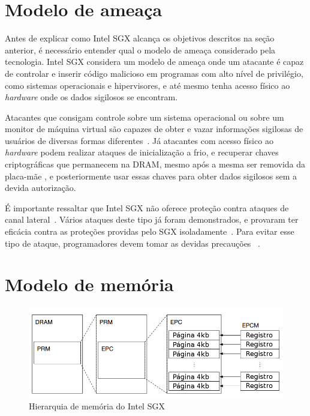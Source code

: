 \section{Modelo de ameaça}
\label{sec:sgx_modelo_ameaca}

Antes de explicar como Intel SGX alcança os objetivos descritos na seção
anterior, é necessário entender qual o modelo de ameaça considerado pela
tecnologia.
Intel SGX considera um modelo de ameaça onde um atacante é capaz de controlar e
inserir código malicioso em programas com alto nível de privilégio, como
sistemas operacionais e hipervisores, e até mesmo tenha acesso físico ao
\textit{hardware} onde os dados sigilosos se encontram.

Atacantes que consigam controle sobre um sistema operacional ou sobre um monitor
de máquina virtual são capazes de obter e vazar informações sigilosas de
usuários de diversas formas diferentes~\cite{trustshadow2017}.
Já atacantes com acesso físico ao \textit{hardware} podem realizar ataques de
inicialização a frio, e recuperar chaves criptográficas que permanecem na DRAM,
mesmo após a mesma ser removida da placa-mãe \cite{coldbootattack}, e
posteriormente usar essas chaves para obter dados sigilosos sem a devida
autorização.

É importante ressaltar que Intel SGX não oferece proteção contra ataques de
canal lateral~\cite{sgxdeveloperreference}. Vários ataques deste tipo já foram
demonstrados, e provaram ter eficácia contra as proteções providas pelo SGX
isoladamente~\cite{cachezoom2017,gotzfried2017cache,lee2016inferring}. Para
evitar esse tipo de ataque, programadores devem tomar as devidas precauções
~\cite{shinde2015preventing,seo2017sgx,shih2017t}.

\section{Modelo de memória}
\label{sec:sgx_modelo_memoria}

\begin{figure}[ht]
\centering
\includegraphics[width=5in]{img/hierarquia_memoria_sgx_pt_BR}
\caption{Hierarquia de memória do Intel SGX}
\label{fig:hierarquiamemoria}
\end{figure}

